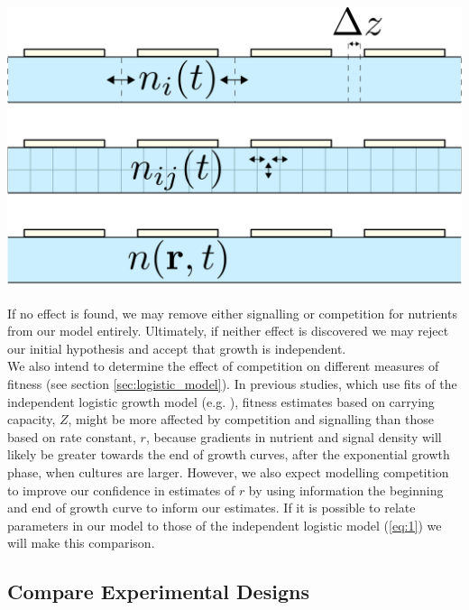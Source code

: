 \begin{Figure}
  \centering
  \includegraphics[width=\linewidth]{height_dep_miniqfa_delta_z}
  \label{fig:height_dependence}
\end{Figure}

If no effect is found, we may remove either signalling or competition
for nutrients from our model entirely. Ultimately, if neither effect
is discovered we may reject our initial hypothesis and accept that
growth is independent.
\\

We also intend to determine the effect of competition on different
measures of fitness (see section \ref{sec:logistic_model}). In
previous studies, which use fits of the independent logistic growth
model (e.g. \citet{Addinall2011}), fitness estimates based on carrying
capacity, \(Z\), might be more affected by competition and signalling
than those based on rate constant, \(r\), because gradients in
nutrient and signal density will likely be greater towards the end of
growth curves, after the exponential growth phase, when cultures are
larger. However, we also expect modelling competition to improve our
confidence in estimates of \(r\) by using information the beginning
and end of growth curve to inform our estimates. If it is possible to
relate parameters in our model to those of the independent logistic
model (\ref{eq:1}) we will make this comparison.


\subsection{Compare Experimental Designs}
\label{sec:comp-exper-designs}

